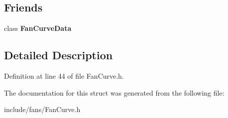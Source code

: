 \subsection*{Friends}
\begin{DoxyCompactItemize}
\item 
\mbox{\label{struct_fan_curve_data_1_1_rated_point_a84779ae1f4b93a96435593980fe1445b}} 
class {\bfseries Fan\+Curve\+Data}
\end{DoxyCompactItemize}


\subsection{Detailed Description}


Definition at line 44 of file Fan\+Curve.\+h.



The documentation for this struct was generated from the following file\+:\begin{DoxyCompactItemize}
\item 
include/fans/Fan\+Curve.\+h\end{DoxyCompactItemize}
